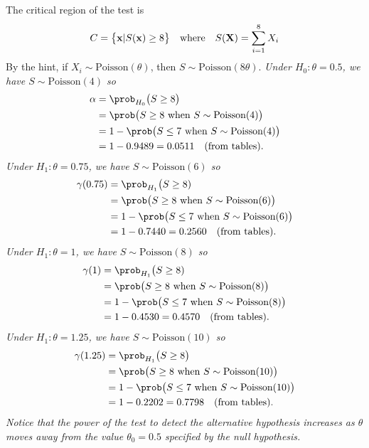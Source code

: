 \begin{solution}
The critical region of the test is 
\[
C = \big\{\mathbf{x} | S(\mathbf{x}) \geq 8\big\}
\text{\quad where\quad}
S(\mathbf{X}) = \sum_{i=1}^8 X_i
\]
By the hint, if $X_i\sim\text{Poisson}(\theta)$, then $S\sim\text{Poisson}(8\theta)$.
\ben
\it %
Under $H_0:\theta=0.5$, we have $S\sim\text{Poisson}(4)$ so
\begin{align*}
\alpha	& = \prob_{H_0}\big(S\geq 8\big) \\
		& = \prob\big(S\geq 8\text{ when } S\sim\text{Poisson}(4)\big) \\
		& = 1 - \prob\big(S\leq 7\text{ when } S\sim\text{Poisson}(4)\big)	\\
		& = 1 - 0.9489 = 0.0511 \quad\text{(from tables).}
\end{align*}
\it %
Under $H_1:\theta=0.75$, we have $S\sim\text{Poisson}(6)$ so
\begin{align*}
\gamma(0.75)	& = \prob_{H_1}\big(S\geq 8) \\
			& = \prob\big(S\geq 8\text{ when }S\sim\text{Poisson}(6)\big) \\
			& = 1 - \prob\big(S\leq 7\text{ when }S\sim\text{Poisson}(6)\big) \\
			& = 1 - 0.7440 = 0.2560 \quad\text{(from tables).}\\ 
\end{align*}
Under $H_1:\theta=1$, we have $S\sim\text{Poisson}(8)$ so
\begin{align*}
\gamma(1)	& = \prob_{H_1}\big(S\geq 8) \\
			& = \prob\big(S\geq 8\text{ when }S\sim\text{Poisson}(8)\big) \\
			& = 1 - \prob\big(S\leq 7\text{ when } S\sim\text{Poisson}(8)\big) \\
			& = 1 - 0.4530 = 0.4570 \quad\text{(from tables).}\\ 
\end{align*}
Under $H_1:\theta=1.25$, we have $S\sim\text{Poisson}(10)$ so
\begin{align*}
\gamma(1.25)	& = \prob_{H_1}\big(S\geq 8\big) \\
			& = \prob\big(S\geq 8\text{ when } S\sim\text{Poisson}(10)\big) \\
			& = 1 - \prob\big(S\leq 7\text{ when } S\sim\text{Poisson}(10)\big) \\
			& = 1 - 0.2202 = 0.7798 \quad\text{(from tables).}\\ 
\end{align*}
Notice that the power of the test to detect the alternative hypothesis \emph{increases} as $\theta$ moves away from the value $\theta_0=0.5$ specified by the null hypothesis.
\een

\end{solution}

\stopcontents[chapters]
\endinput
